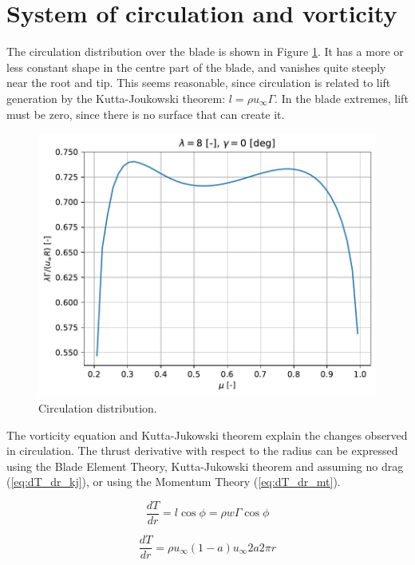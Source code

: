\section{System of circulation and vorticity }

The circulation distribution over the blade is shown in Figure \ref{img:gamma_}. It has a more or less constant shape in the centre part of the blade, and vanishes quite steeply near the root and tip. This seems reasonable, since circulation is related to lift generation by the Kutta-Joukowski theorem: $ l = \rho u_{\infty} \Gamma $. In the blade extremes, lift must be zero, since there is no surface that can create it.

\begin{figure}[htbp]
	\centering
	\includegraphics[height=0.45\textheight]{./img/circulation/gamma_.pdf}
	\caption{Circulation distribution.}
	\label{img:gamma_}
\end{figure}

The vorticity equation and Kutta-Jukowski theorem explain the changes observed in circulation. The thrust derivative with respect to the radius can be expressed using the Blade Element Theory, Kutta-Jukowski theorem and assuming no drag (\ref{eq:dT_dr_kj}), or using the Momentum Theory (\ref{eq:dT_dr_mt}).

\begin{equation}
	\frac{dT}{dr} = l \cos \phi = \rho w \Gamma \cos \phi
	\label{eq:dT_dr_kj}
\end{equation}

\begin{equation}
	\frac{dT}{dr} = \rho u_{\infty} (1-a) u_{\infty} 2a 2\pi r
	\label{eq:dT_dr_mt}
\end{equation}

